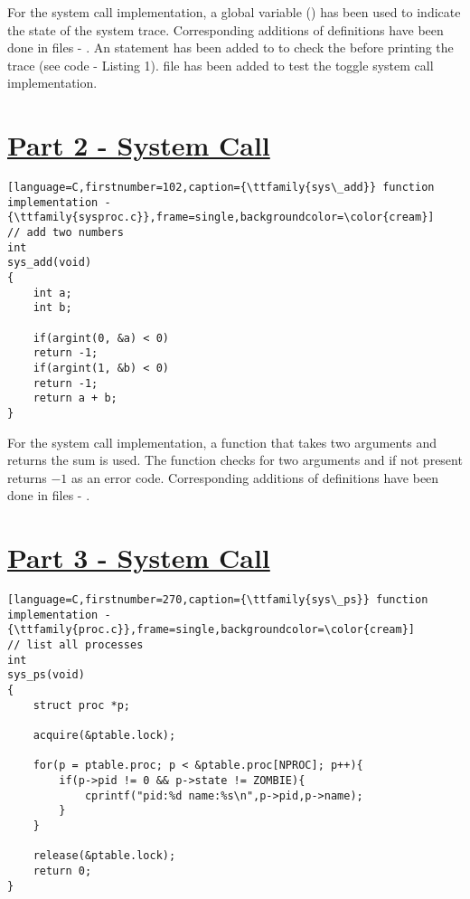 \documentclass[12pt]{article}
\begin{document}
\vspace{5mm}
\begin{addmargin}[0.1in]{0in}
    For the {} system call implementation, a global variable ({}) has been used to indicate the state of the system trace. Corresponding additions of definitions have been done in files - {}. An {} statement has been added to {} to check the {} before printing the trace (see code - Listing 1). {} file has been added to test the toggle system call implementation.
\end{addmargin}

\section*{\underline{Part 2 - {} System Call}}
\begin{addmargin}[0.7in]{0in}
\begin{lstlisting}[language=C,firstnumber=102,caption={\ttfamily{sys\_add}} function implementation - {\ttfamily{sysproc.c}},frame=single,backgroundcolor=\color{cream}]
// add two numbers
int
sys_add(void)
{
    int a;
    int b;

    if(argint(0, &a) < 0)
    return -1;
    if(argint(1, &b) < 0)
    return -1;
    return a + b;
}
\end{lstlisting}
\end{addmargin}

\begin{addmargin}[0.1in]{0in}
    For the {} system call implementation, a function that takes two arguments and returns the sum is used. The function checks for two arguments and if not present returns $-1$ as an error code. Corresponding additions of definitions have been done in files - {}.
\end{addmargin}

\section*{\underline{Part 3 - {} System Call}}
\begin{addmargin}[0.7in]{0in}
\begin{lstlisting}[language=C,firstnumber=270,caption={\ttfamily{sys\_ps}} function implementation - {\ttfamily{proc.c}},frame=single,backgroundcolor=\color{cream}]
// list all processes
int
sys_ps(void)
{
    struct proc *p;
    
    acquire(&ptable.lock);

    for(p = ptable.proc; p < &ptable.proc[NPROC]; p++){
        if(p->pid != 0 && p->state != ZOMBIE){
            cprintf("pid:%d name:%s\n",p->pid,p->name);
        }
    }

    release(&ptable.lock);
    return 0;
}
\end{lstlisting}
\end{addmargin}
\end{document}
